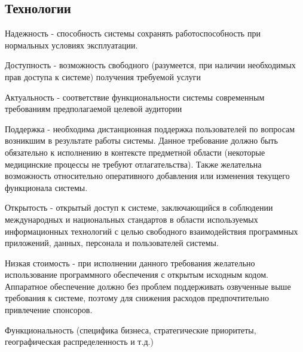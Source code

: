 \subsection{Технологии}
Надежность - способность системы сохранять работоспособность при нормальных
условиях эксплуатации.

Доступность - возможность свободного (разумеется, при наличии необходимых прав
доступа к системе) получения требуемой услуги 

Актуальность - соответствие
функциональности системы современным требованиям предполагаемой целевой
аудитории 

Поддержка - необходима дистанционная поддержка пользователей по
вопросам возникшим в результате работы системы. Данное требование должно быть
обязательно к исполнению в контексте предметной области (некоторые медицинские
процессы не требуют отлагательства). Также желательна возможность относительно
оперативного добавления или изменения текущего функционала системы.

Открытость - открытый доступ к системе, заключающийся в соблюдении
международных и национальных стандартов в области используемых информационных
технологий с целью свободного взаимодействия  программных приложений, данных,
персонала и пользователей системы.

Низкая стоимость - при исполнении данного требования желательно использование
программного обеспечения с открытым исходным кодом. Аппаратное обеспечение
должно без проблем поддерживать озвученные выше требования к системе, поэтому
для снижения расходов предпочтительно привлечение спонсоров.

Функциональность (специфика бизнеса, стратегические приоритеты, географическая
распределенность и т.д.)
